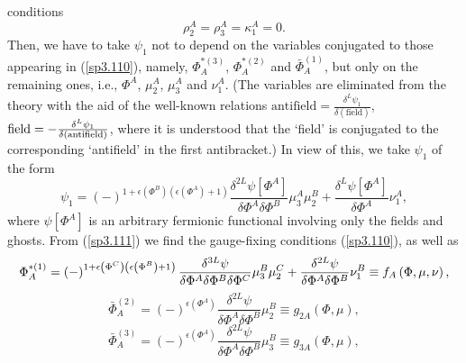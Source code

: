 \documentclass[a4paper,12pt]{article}
\begin{document}
conditions 
\begin{equation}
\rho _{2}^{A}=\rho _{3}^{A}=\kappa _{1}^{A}=0.  \label{sp3.110}
\end{equation}
Then, we have to take $\psi _{1}$ not to depend on the variables conjugated
to those appearing in (\ref{sp3.110}), namely, $\Phi _{A}^{*(3)}$, $\Phi
_{A}^{*(2)}$ and $\bar{\Phi}_{A}^{(1)}$, but only on the remaining ones,
i.e., $\Phi ^{A}$, $\mu _{2}^{A}$, $\mu _{3}^{A}$ and $\nu _{1}^{A}$. (The
variables are eliminated from the theory with the aid of the well-known
relations $\mathrm{antifield}=\frac{\delta ^{L}\psi _{1}}{\delta \left( 
\mathrm{field}\right) }$,\ $\mathrm{field}=-\frac{\delta ^{L}\psi _{1}}{%
\delta \left( \mathrm{antifield}\right) }$, where it is understood that the
`field' is conjugated to the corresponding `antifield' in the first
antibracket.) In view of this, we take $\psi _{1}$ of the form 
\begin{equation}
\psi _{1}=\left( -\right) ^{1+\epsilon \left( \Phi ^{B}\right) \left(
\epsilon \left( \Phi ^{A}\right) +1\right) }\frac{\delta ^{2L}\psi \left[
\Phi ^{A}\right] }{\delta \Phi ^{A}\delta \Phi ^{B}}\mu _{3}^{A}\mu _{2}^{B}+%
\frac{\delta ^{L}\psi \left[ \Phi ^{A}\right] }{\delta \Phi ^{A}}\nu
_{1}^{A},  \label{sp3.111}
\end{equation}
where $\psi \left[ \Phi ^{A}\right] $ is an arbitrary fermionic functional
involving only the fields and ghosts. From (\ref{sp3.111}) we find the
gauge-fixing conditions (\ref{sp3.110}), as well as 
\begin{equation}
\Phi _{A}^{*(1)}=\left( -\right) ^{1+\epsilon \left( \Phi ^{C}\right) \left(
\epsilon \left( \Phi ^{B}\right) +1\right) }\frac{\delta ^{3L}\psi }{\delta
\Phi ^{A}\delta \Phi ^{B}\delta \Phi ^{C}}\mu _{3}^{B}\mu _{2}^{C}+\frac{%
\delta ^{2L}\psi }{\delta \Phi ^{A}\delta \Phi ^{B}}\nu _{1}^{B}\equiv
f_{A}\left( \Phi ,\mu ,\nu \right) ,  \label{sp3.112}
\end{equation}
\begin{equation}
\bar{\Phi}_{A}^{(2)}=\left( -\right) ^{\epsilon \left( \Phi ^{A}\right) }%
\frac{\delta ^{2L}\psi }{\delta \Phi ^{A}\delta \Phi ^{B}}\mu _{2}^{B}\equiv
g_{2A}\left( \Phi ,\mu \right) ,  \label{sp3.113}
\end{equation}
\begin{equation}
\bar{\Phi}_{A}^{(3)}=\left( -\right) ^{\epsilon \left( \Phi ^{A}\right) }%
\frac{\delta ^{2L}\psi }{\delta \Phi ^{A}\delta \Phi ^{B}}\mu _{3}^{B}\equiv
g_{3A}\left( \Phi ,\mu \right) ,  \label{sp3.114}
\end{equation}
\end{document}

